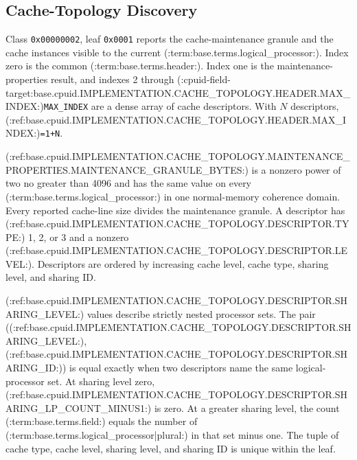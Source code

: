 \subsection{Cache-Topology Discovery}
Class \texttt{0x00000002}, leaf \texttt{0x0001} reports the cache-maintenance granule and the cache instances visible
to the current (:term:base.terms.logical_processor:). Index zero is the common (:term:base.terms.header:). Index one is the maintenance-properties result,
and indexes 2 through (:cpuid-field-target:base.cpuid.IMPLEMENTATION.CACHE_TOPOLOGY.HEADER.MAX_INDEX:)\texttt{MAX\_INDEX} are a dense array of cache descriptors. With $N$ descriptors,
(:ref:base.cpuid.IMPLEMENTATION.CACHE_TOPOLOGY.HEADER.MAX_INDEX:)\texttt{=1+N}.



(:ref:base.cpuid.IMPLEMENTATION.CACHE_TOPOLOGY.MAINTENANCE_PROPERTIES.MAINTENANCE_GRANULE_BYTES:) is a nonzero power of two no greater than 4096 and has the same value on every
(:term:base.terms.logical_processor:) in one normal-memory coherence domain. Every reported cache-line size divides the maintenance
granule. A descriptor has (:ref:base.cpuid.IMPLEMENTATION.CACHE_TOPOLOGY.DESCRIPTOR.TYPE:) 1, 2, or 3 and a nonzero (:ref:base.cpuid.IMPLEMENTATION.CACHE_TOPOLOGY.DESCRIPTOR.LEVEL:). Descriptors are
ordered by increasing cache level, cache type, sharing level, and sharing ID.

(:ref:base.cpuid.IMPLEMENTATION.CACHE_TOPOLOGY.DESCRIPTOR.SHARING_LEVEL:) values describe strictly nested processor sets. The pair
((:ref:base.cpuid.IMPLEMENTATION.CACHE_TOPOLOGY.DESCRIPTOR.SHARING_LEVEL:), (:ref:base.cpuid.IMPLEMENTATION.CACHE_TOPOLOGY.DESCRIPTOR.SHARING_ID:)) is equal exactly when two descriptors name the same logical-processor set.
At sharing level zero, (:ref:base.cpuid.IMPLEMENTATION.CACHE_TOPOLOGY.DESCRIPTOR.SHARING_LP_COUNT_MINUS1:) is zero. At a greater sharing level, the count (:term:base.terms.field:)
equals the number of (:term:base.terms.logical_processor|plural:) in that set minus one. The tuple of cache type, cache level, sharing level,
and sharing ID is unique within the leaf.
